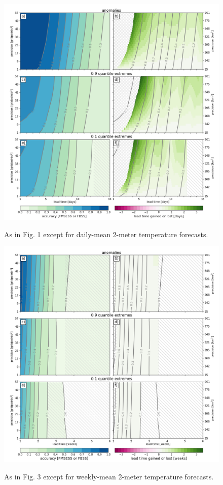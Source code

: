 \documentclass[preprint,12pt,authoryear]{elsarticle}
\begin{document}
\newpage
\begin{figure}[t]
  \noindent\includegraphics[scale=0.45]{fig_S3.png}\\
  \caption{As in Fig. 1 except for daily-mean 2-meter temperature forecasts.}\label{f3}
\end{figure}

\newpage
\begin{figure}[t]
  \noindent\includegraphics[scale=0.45]{fig_S4.png}\\
  \caption{As in Fig. 3 except for weekly-mean 2-meter temperature forecasts.} \label{f4}
\end{figure}
\end{document}
